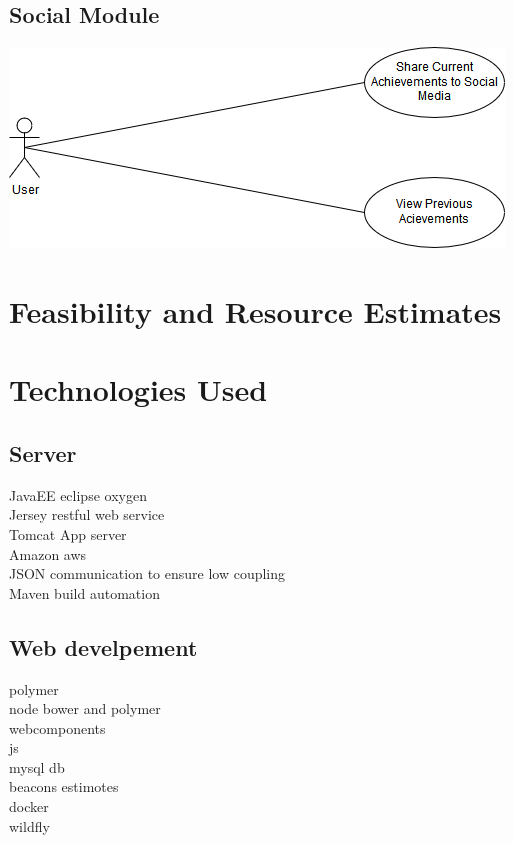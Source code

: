 \documentclass[11pt]{article}
\begin{document}
\subsection{Social Module}
\includegraphics[width=0.7\linewidth]{images/Social.png}\\[1cm]

\section{Feasibility and Resource Estimates}

\section{Technologies Used}
\subsection{Server}
JavaEE eclipse oxygen\\
Jersey restful web service\\
Tomcat App server\\
Amazon aws\\
JSON communication to ensure low coupling\\
Maven build automation\\
\subsection{Web develpement}
polymer\\
node bower and polymer\\
webcomponents\\
js\\
mysql db\\
beacons estimotes\\
docker\\
wildfly\\
\end{document}
